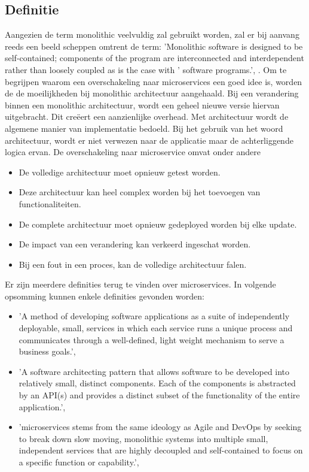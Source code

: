 \subsection{Definitie}
Aangezien de term monolithic veelvuldig zal gebruikt worden, zal er bij aanvang reeds een beeld scheppen omtrent de term:  'Monolithic software is designed to be self-contained; components of the program are interconnected and interdependent rather than loosely coupled as is the case with ' software programs.',  \textcite{Wigmore2016}.
Om te begrijpen waarom een overschakeling naar microservices een goed idee is, worden de de moeilijkheden bij monolithic architectuur aangehaald. Bij een verandering binnen een monolithic architectuur, wordt een geheel nieuwe  versie hiervan uitgebracht. Dit creëert een aanzienlijke overhead. Met architectuur wordt de algemene manier van implementatie bedoeld. Bij het gebruik van het woord architectuur, wordt er niet verwezen naar de applicatie maar de achterliggende logica ervan.
De overschakeling naar microservice omvat onder andere
\begin{itemize}
	\item De volledige architectuur moet opnieuw getest worden.
	\item Deze architectuur kan heel complex worden bij het toevoegen van functionaliteiten.
	\item De complete architectuur moet opnieuw gedeployed worden bij elke update.
	\item De impact van een verandering kan verkeerd ingeschat worden.
	\item Bij een fout in een proces, kan de volledige architectuur falen.
\end{itemize}
Er zijn meerdere definities terug te vinden over microservices. In volgende opsomming kunnen enkele definities gevonden worden:
\begin{itemize}
	\item 'A method of developing software applications as a suite of independently deployable, small, services in which each service runs a unique process and communicates through a  well-defined, light weight mechanism to serve a business goals.', \textcite{Mauersberger2017}
	\item 'A software architecting pattern that allows software to be developed into relatively small, distinct components. Each of the components is abstracted by an API(s) and provides a distinct subset of the functionality of the entire application.', \textcite{Watts2018}
	\item 'microservices stems from the same ideology as Agile and DevOps by seeking to break down slow moving, monolithic systems into multiple small, independent services that are highly decoupled and self-contained to focus on a specific function or capability.', \textcite{Benetis2016a}
\end{itemize}
